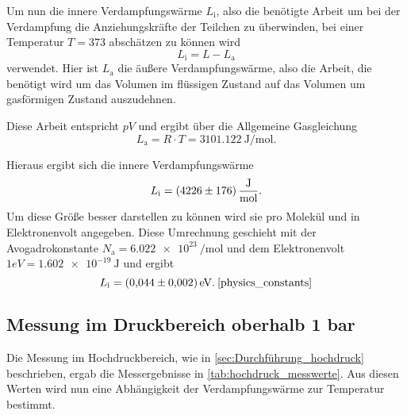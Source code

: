 Um nun die innere Verdampfungswärme $L_\text{i}$, also die benötigte Arbeit um bei der Verdampfung die Anziehungskräfte der Teilchen zu überwinden, bei einer Temperatur $T=373$ abschätzen zu können wird
\begin{equation}
    L_\text{i} = L - L_\text{a}
\end{equation}
verwendet. 
Hier ist $L_\text{a}$ die äußere Verdampfungswärme, also die Arbeit, die benötigt wird um das Volumen im flüssigen Zustand auf das Volumen um gasförmigen Zustand auszudehnen.\cite{V203}

Diese Arbeit entspricht $pV$ und ergibt über die Allgemeine Gasgleichung
\begin{equation*}
    L_\text{a} = R \cdot T = \SI{3101.122}{\joule\per\mol}.
\end{equation*}

Hieraus ergibt sich die innere Verdampfungswärme
\begin{equation*}
    L_\text{i} = \SI{4226+-176}{\joule\per\mol}.
\end{equation*}
Um diese Größe besser darstellen zu können wird sie pro Molekül und in Elektronenvolt angegeben.
Diese Umrechnung geschieht mit der Avogadrokonstante $N_\text{a} = \SI{6.022e23}{\per\mol}$ und dem Elektronenvolt $1 eV = \SI{1.602e-19}{\joule}$ und ergibt
\begin{equation*}
    L_\text{i} = \SI{0.044+-0.002}{\electronvolt}. \: \text{\cite{physics_constants}}
\end{equation*}


\subsection{Messung im Druckbereich oberhalb 1 bar}
\label{sec:Auswertung_hochdruck}

Die Messung im Hochdruckbereich, wie in \autoref{sec:Durchführung_hochdruck} beschrieben, ergab die Messergebnisse in \autoref{tab:hochdruck_messwerte}.
Aus diesen Werten wird nun eine Abhängigkeit der Verdampfungswärme zur Temperatur bestimmt.

